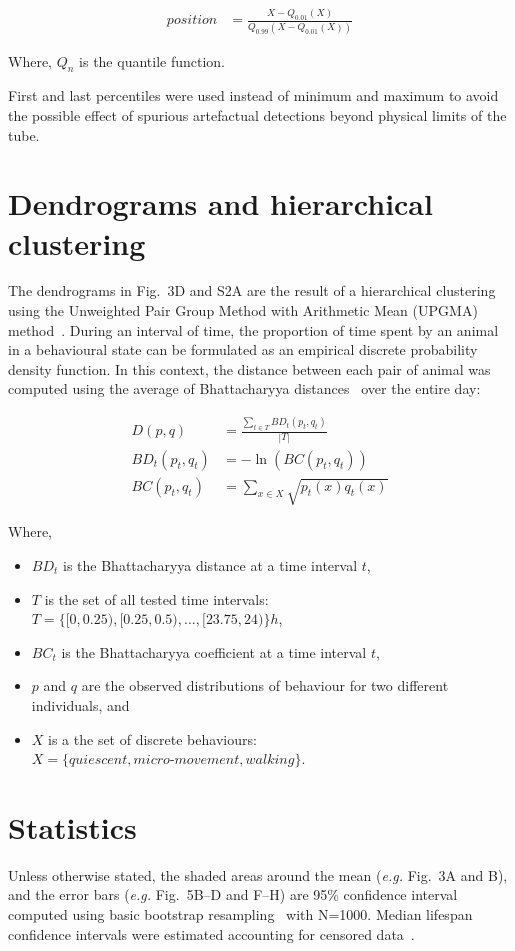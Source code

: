 \documentclass[a4paper,twoside,openright]{article}
\begin{document}
\begin{align}
position &=  \frac{X - Q_{0.01}(X)}{Q_{0.99}(X - Q_{0.01}(X))}
\end{align}

Where, $Q_n$ is the quantile function.

First and last percentiles were used instead of minimum and maximum to avoid the possible effect of spurious artefactual detections beyond physical limits of the tube.

%
\section*{Dendrograms and hierarchical clustering}
The dendrograms in Fig.~3D and S2A are the result of a hierarchical clustering using the Unweighted Pair Group Method with Arithmetic Mean (UPGMA) method~\cite{sokal_statistical_1958}.
During an interval of time, the proportion of time spent by an animal in a behavioural state can be formulated as an empirical discrete probability density function.
In this context, the distance between each pair of animal was computed using the average of Bhattacharyya distances~\cite{bhattacharyya_measure_1943} over the entire day:

\begin{align}
D(p,q) &=  \frac{\sum_{t \in T}{BD_t(p_t,q_t)}}{|T|} \\
BD_t(p_t,q_t) &= -\ln (BC(p_t,q_t))\\
BC(p_t,q_t) &= \sum_{x\in X} \sqrt{p_t(x) q_t(x)}
\end{align}


Where,
\begin{itemize}
\item $BD_t$ is the Bhattacharyya distance at a time interval $t$,
\item $T$ is the set of all tested time intervals: $T=\{[0, 0.25), [0.25,0.5), ..., [23.75, 24)\} h$,
\item $BC_t$ is the Bhattacharyya coefficient at a time interval $t$,
\item $p$ and $q$ are the observed distributions of behaviour for two different individuals, and
\item $X$ is a the set of discrete behaviours: $X = \{quiescent, micro\text{-}movement, walking\}$.
\end{itemize}

%
\section*{Statistics}
Unless otherwise stated, the shaded areas around the mean (\emph{e.g.} Fig.~3A and B), and the error bars (\emph{e.g.} Fig.~5B--D and F--H) are 95\% confidence interval computed using basic bootstrap resampling~\cite{efron_bootstrap_1979} with N=1000.
Median lifespan confidence intervals were estimated  accounting for censored data~\cite{akritas1986bootstrapping}.
\end{document}
